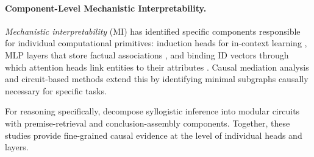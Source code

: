 \documentclass[11pt]{article}
\begin{document}
\paragraph{Component-Level Mechanistic Interpretability.}
\textit{Mechanistic interpretability} (MI) has identified specific components responsible for individual computational primitives: induction heads for in-context learning \citep{olsson2022incontextlearninginductionheads}, MLP layers that store factual associations \citep{meng2023locatingeditingfactualassociations, geva2023dissectingrecallfactual, ferrando2025informationflowlarge}, and binding ID vectors through which attention heads link entities to their attributes \citep{feng2024languagemodelsrepresent, wang2023labelwordsanchors}. Causal mediation analysis \citep{vig2020causalinterpretingneuralNLP, hase2024doeslocalizationinform, zhang2024towardsbestpractices, heimersheim2024useinterpretactivation} and circuit-based methods \citep{elhage2021mathematicalframeworktransformer, wang2022interpretabilitywildcircuitindirect} extend this by identifying minimal subgraphs causally necessary for specific tasks.
%
%

For reasoning specifically, \citet{kim2024reasoningcircuitslanguage} decompose syllogistic inference into modular circuits with premise-retrieval and conclusion-assembly components. Together, these studies provide fine-grained causal evidence at the level of individual heads and layers.
\end{document}
